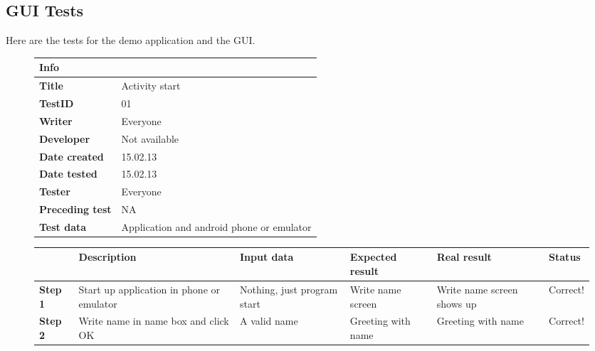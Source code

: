 \subsection{GUI Tests}
Here are the tests for the demo application and the GUI.
\begin{figure}[H]
\small

\begin{tabularx}{\textwidth }{|l|X|}
\hline
\cellcolor{blue!25}\textbf{Info} & \cellcolor{blue!25}\\
\hline
\textbf{Title} &Activity start\\
\hline
\textbf{TestID} & 01\\
\hline
\textbf{Writer}& Everyone\\
\hline
\textbf{Developer}& Not available\\
\hline
\textbf{Date created}& 15.02.13\\
\hline
\textbf{Date tested}& 15.02.13\\
\hline
\textbf{Tester}& Everyone\\
\hline
\textbf{Preceding test}& NA\\
\hline
\textbf{Test data} & Application and android phone or emulator \\
\hline
\end{tabularx}

\begin{tabularx}{\textwidth}{|X|X|X|X|X|X|}
\hline
\cellcolor{blue!25}&
\cellcolor{blue!25}Description&
\cellcolor{blue!25}Input data&
\cellcolor{blue!25}Expected result&
\cellcolor{blue!25}Real result&
\cellcolor{blue!25}Status\\
\hline
\textbf{Step 1} & Start up application in phone or emulator & Nothing, just program start & Write name screen & Write name screen shows up & Correct!\\
\hline
\textbf{Step 2} & Write name in name box and click OK & A valid name & Greeting with name & Greeting with name & Correct!\\
\hline
\end{tabularx}
\label{fig:test01}
\end{figure}

